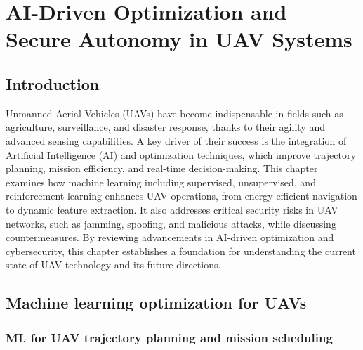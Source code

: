 
\chapter{AI-Driven Optimization and Secure Autonomy in UAV Systems}





\section*{Introduction}


Unmanned Aerial Vehicles (UAVs) have become indispensable in fields such as agriculture, surveillance, and disaster response, thanks to their agility and advanced sensing capabilities. A key driver of their success is the integration of Artificial Intelligence (AI) and optimization techniques, which improve trajectory planning, mission efficiency, and real-time decision-making. This chapter examines how machine learning including supervised, unsupervised, and reinforcement learning enhances UAV operations, from energy-efficient navigation to dynamic feature extraction. It also addresses critical security risks in UAV networks, such as jamming, spoofing, and malicious attacks, while discussing countermeasures. By reviewing advancements in AI-driven optimization and cybersecurity, this chapter establishes a foundation for understanding the current state of UAV technology and its future directions.





\section{Machine learning optimization for UAVs}






\subsection{ML for UAV trajectory planning and mission scheduling}



